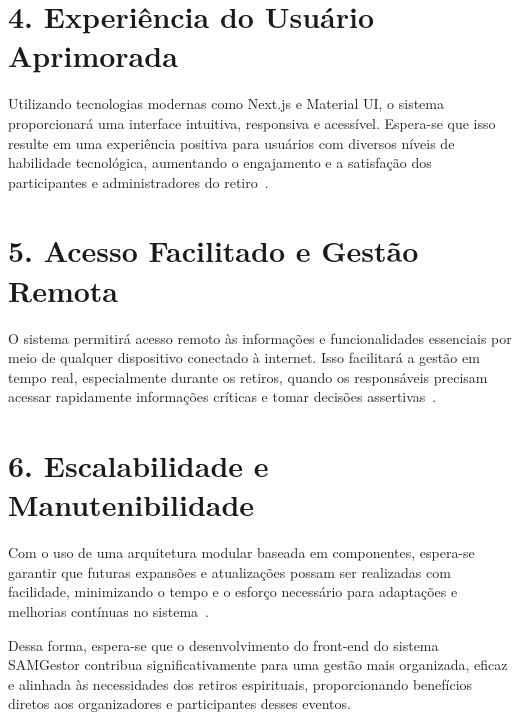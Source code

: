 \section*{4. Experiência do Usuário Aprimorada}

Utilizando tecnologias modernas como Next.js e Material UI, o sistema proporcionará uma interface intuitiva, responsiva e acessível. Espera-se que isso resulte em uma experiência positiva para usuários com diversos níveis de habilidade tecnológica, aumentando o engajamento e a satisfação dos participantes e administradores do retiro~\cite{preece2013}.

\section*{5. Acesso Facilitado e Gestão Remota}

O sistema permitirá acesso remoto às informações e funcionalidades essenciais por meio de qualquer dispositivo conectado à internet. Isso facilitará a gestão em tempo real, especialmente durante os retiros, quando os responsáveis precisam acessar rapidamente informações críticas e tomar decisões assertivas~\cite{laudon2020}.

\section*{6. Escalabilidade e Manutenibilidade}

Com o uso de uma arquitetura modular baseada em componentes, espera-se garantir que futuras expansões e atualizações possam ser realizadas com facilidade, minimizando o tempo e o esforço necessário para adaptações e melhorias contínuas no sistema~\cite{gamma1995}.

\vspace{0.5cm}

Dessa forma, espera-se que o desenvolvimento do front-end do sistema SAMGestor contribua significativamente para uma gestão mais organizada, eficaz e alinhada às necessidades dos retiros espirituais, proporcionando benefícios diretos aos organizadores e participantes desses eventos.
